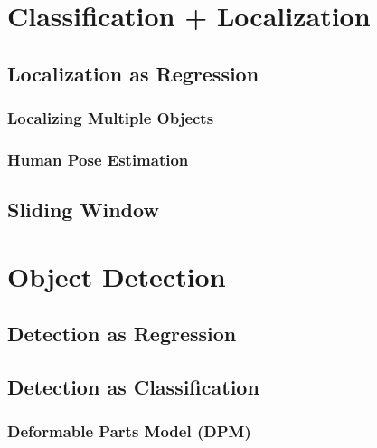 	\section{Classification + Localization} %

		\subsection{Localization as Regression} %

			\subsubsection{Localizing Multiple Objects} %

			\subsubsection{Human Pose Estimation} %

		\subsection{Sliding Window} %

	\section{Object Detection} %

		\subsection{Detection as Regression} %

		\subsection{Detection as Classification} %

			\subsubsection{Deformable Parts Model (DPM)} %

